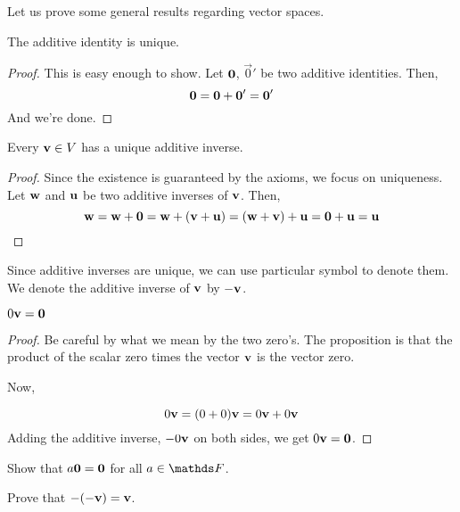 Let us prove some general results regarding vector spaces. 

\begin{proposition}
    The additive identity is unique.
\end{proposition}

\begin{proof}
    This is easy enough to show. Let \(\boldsymbol{\mathbf{0}}\), \(\vec{0}'\) be two additive identities.
    Then, 
    \begin{equation*}
        \boldsymbol{\mathbf{0}} = \boldsymbol{\mathbf{0}} + \boldsymbol{\mathbf{0}}' = \boldsymbol{\mathbf{0}}'
    \end{equation*}
    And we're done.
\end{proof}

\begin{proposition}
    Every \(\boldsymbol{\mathbf{v}} \in V\) has a unique additive inverse.
\end{proposition}

\begin{proof}
    Since the existence is guaranteed by the axioms, we focus on uniqueness.
    Let \(\boldsymbol{\mathbf{w}}\) and \(\boldsymbol{\mathbf{u}}\) be two additive inverses of \(\boldsymbol{\mathbf{v}}\). Then,
    \begin{equation*}
        \boldsymbol{\mathbf{w}} = \boldsymbol{\mathbf{w}} + \boldsymbol{\mathbf{0}} = \boldsymbol{\mathbf{w}} + (\boldsymbol{\mathbf{v}} + \boldsymbol{\mathbf{u}}) = (\boldsymbol{\mathbf{w}} + \boldsymbol{\mathbf{v}}) + \boldsymbol{\mathbf{u}} = \boldsymbol{\mathbf{0}} + \boldsymbol{\mathbf{u}} = \boldsymbol{\mathbf{u}} 
    \end{equation*}
\end{proof}

Since additive inverses are unique, we can use particular symbol to denote them. We denote 
the additive inverse of \(\boldsymbol{\mathbf{v}}\) by \(-\boldsymbol{\mathbf{v}}\). 

\begin{proposition}
    \(0\boldsymbol{\mathbf{v}} = \boldsymbol{\mathbf{0}}\)
\end{proposition}

\begin{proof}
    Be careful by what we mean by the two zero's. The proposition is that the 
    product of the scalar zero times the vector \(\boldsymbol{\mathbf{v}}\) is the vector zero.

    Now,

    \begin{equation*}
        0\boldsymbol{\mathbf{v}} = (0 + 0)\boldsymbol{\mathbf{v}} = 0\boldsymbol{\mathbf{v}} + 0\boldsymbol{\mathbf{v}}
    \end{equation*}
    Adding the additive inverse, \(-0\boldsymbol{\mathbf{v}}\) on both sides, we get \(0\boldsymbol{\mathbf{v}} = \boldsymbol{\mathbf{0}}\).
\end{proof}

\begin{exc}
    \begin{exercise}[points = 1]
        Show that \(a\boldsymbol{\mathbf{0}} = \boldsymbol{\mathbf{0}}\) for all \(a \in \FF\).
    \end{exercise}

    \begin{exercise}[points = 1]
        Prove that \(-(-\boldsymbol{\mathbf{v}}) = \boldsymbol{\mathbf{v}}\).
    \end{exercise}

\end{exc}

